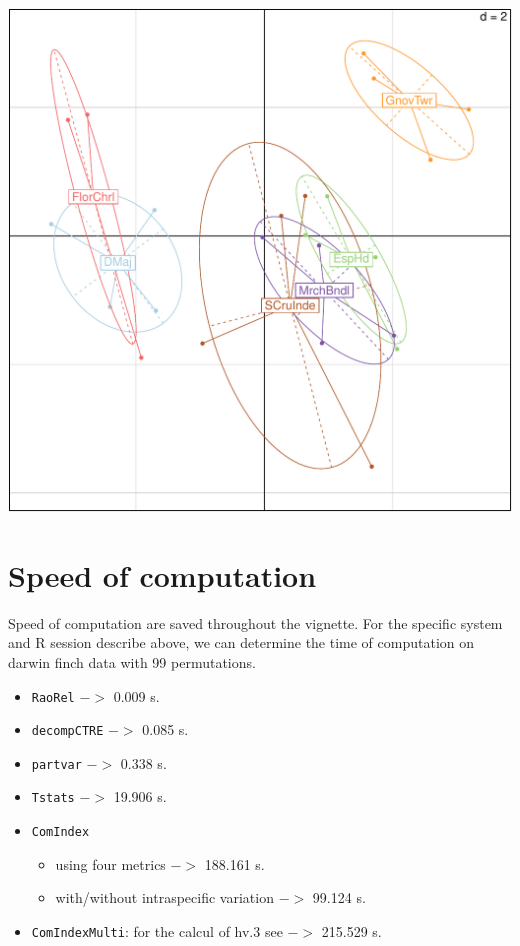 \documentclass[12pt]{article}\usepackage[]{graphicx}\usepackage[]{color}
\makeatletter
\def\maxwidth{ %
  \ifdim\Gin@nat@width>\linewidth
    \linewidth
  \else
    \Gin@nat@width
  \fi
}
\newenvironment{knitrout}{}{} %
\makeatother
\begin{document}
\begin{knitrout}
\includegraphics[width=\maxwidth]{figure/unnamed-chunk-69-5} 

\end{knitrout}


\section{Speed of computation}

Speed of computation are saved throughout the vignette. For the specific system and R session describe above, we can determine the time of computation on darwin finch data with 99 permutations.

\begin{itemize}
\item \texttt{RaoRel} $->$ 0.009 s.
\item \texttt{decompCTRE} $->$ 0.085 s.
\item \texttt{partvar} $->$ 0.338 s.
\item \texttt{Tstats} $->$ 19.906 s.
\item \texttt{ComIndex} \begin{itemize}
    \item using four metrics $->$ 188.161 s.
    \item with/without intraspecific variation $->$ 99.124 s.
    \end{itemize}                    
\item \texttt{ComIndexMulti}: for the calcul of hv.3 see \pageref{hv.3} $->$ 215.529 s.
\end{itemize}
\end{document}
